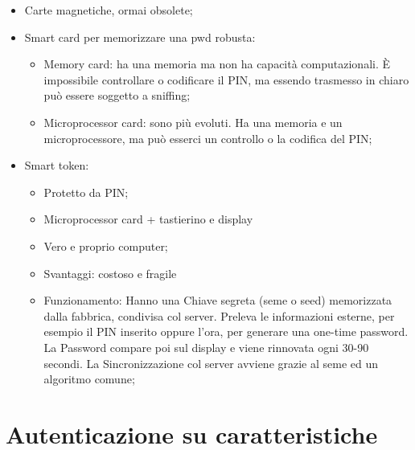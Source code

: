\begin{itemize}
      \item Carte magnetiche, ormai obsolete;
      \item Smart card per memorizzare una pwd robusta:
            \begin{itemize}
                  \item Memory card: ha una memoria ma non ha capacità computazionali.
                        È impossibile
                        controllare o codificare il PIN, ma essendo trasmesso in chiaro può
                        essere soggetto
                        a sniffing;
                  \item Microprocessor card: sono più evoluti. Ha una memoria e
                        un microprocessore, ma
                        può esserci un controllo o la codifica del PIN;
            \end{itemize}
      \item Smart token:
            \begin{itemize}
                  \item Protetto da PIN;
                  \item  Microprocessor card + tastierino e display
                  \item  Vero e proprio computer;
                  \item  Svantaggi: costoso e fragile
                  \item  Funzionamento: Hanno una Chiave segreta (seme o seed)
                        memorizzata dalla fabbrica,
                        condivisa col server. Preleva le informazioni esterne,
                        per esempio il PIN inserito oppure
                        l'ora, per generare una one-time password.
                        La Password compare poi sul display e viene
                        rinnovata ogni 30-90 secondi.
                        La Sincronizzazione col server avviene grazie al seme ed un
                        algoritmo comune;
            \end{itemize}
\end{itemize}

\section{Autenticazione su caratteristiche}

